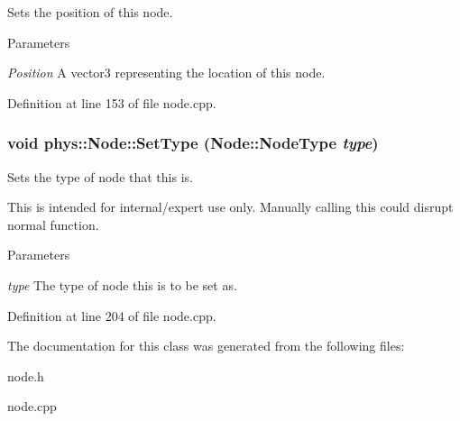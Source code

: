 Sets the position of this node. 


\begin{DoxyParams}{Parameters}
\item[{\em Position}]A vector3 representing the location of this node. \end{DoxyParams}


Definition at line 153 of file node.cpp.

\hypertarget{classphys_1_1Node_afbc58e8c751f617c89a2246c397c679e}{
\subsubsection[{SetType}]{\setlength{\rightskip}{0pt plus 5cm}void phys::Node::SetType (Node::NodeType {\em type})}}
\label{d0/ddc/classphys_1_1Node_afbc58e8c751f617c89a2246c397c679e}


Sets the type of node that this is. 

This is intended for internal/expert use only. Manually calling this could disrupt normal function. 
\begin{DoxyParams}{Parameters}
\item[{\em type}]The type of node this is to be set as. \end{DoxyParams}


Definition at line 204 of file node.cpp.



The documentation for this class was generated from the following files:\begin{DoxyCompactItemize}
\item 
node.h\item 
node.cpp\end{DoxyCompactItemize}
